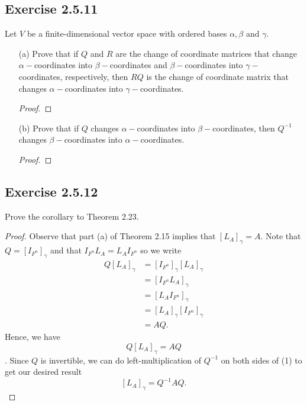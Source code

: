 \subsection*{Exercise 2.5.11} Let \( V  \) be a finite-dimensional vector space with ordered bases \( \alpha, \beta  \) and \( \gamma \).
\begin{enumerate}
    \item[(a)] Prove that if \( Q  \) and \( R  \) are the change of coordinate matrices that change \( \alpha- \)coordinates into \( \beta- \)coordinates and \( \beta- \)coordinates into \( \gamma- \)coordinates, respectively, then \( RQ  \) is the change of coordinate matrix that changes \( \alpha-  \)coordinates into \( \gamma- \)coordinates. 
        \begin{proof}
        
        \end{proof}
    \item[(b)] Prove that if \( Q  \) changes \( \alpha- \)coordinates into \( \beta- \)coordinates, then \( Q^{-1} \) changes \( \beta-  \)coordinates into \( \alpha- \)coordinates.
        \begin{proof}
        
        \end{proof}
\end{enumerate}

\subsection*{Exercise 2.5.12} Prove the corollary to Theorem 2.23.
\begin{proof}
Observe that part (a) of Theorem 2.15 implies that \( [{L}_{A}]_{\gamma} = A  \). Note that \( Q = [{I}_{F^{n}}]_{\gamma} \) and that \( {I}_{F^{n}}{L}_{A} = {L}_{A} {I}_{F^{n}}  \) so we write
\begin{align*}
    Q [{L}_{A}]_{\gamma} &= [{I}_{F^{n}}]_{\gamma} [{L}_{A}]_{\gamma}  \\
                         &= [{I}_{F^{n}} {L}_{A}]_{ \gamma} \\
                         &=  [{L}_{A} {I}_{F^{n}}]_{\gamma} \\
                         &=  [{L}_{A}]_{\gamma} [{I}_{F^{n}}]_{\gamma} \\
                         &= AQ.
\end{align*} 
Hence, we have \[ Q [{L}_{A}]_{\gamma} = AQ \tag{1} \]. Since \( Q  \) is invertible, we can do left-multiplication of \( Q^{-1} \) on both sides of (1) to get our desired result
\[  [{L}_{A}]_{\gamma} = Q^{-1} A Q. \]
\end{proof}

